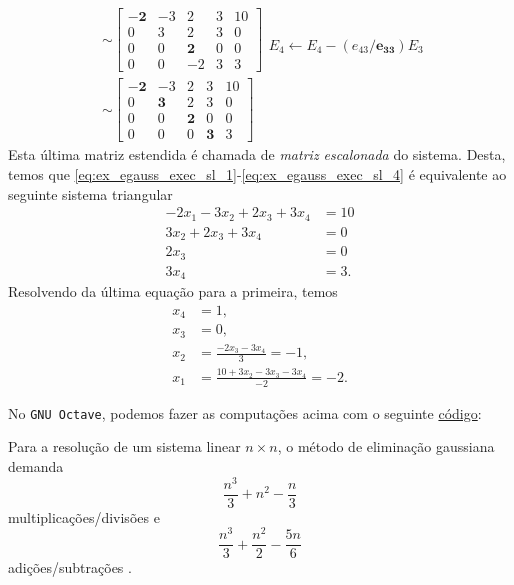 \begin{ex}
\begin{align}
&\sim 
  \begin{bmatrix}
    \pmb{-2} & -3 & 2 & 3 & 10\\
    0 & 3 & 2 & 3 & 0\\
    0 & 0 & \pmb{2} & 0 & 0\\
    0 & 0 & -2 & 3 & 3
  \end{bmatrix}
  \begin{matrix}
  \\
  \\
  \\
  E_4 \leftarrow E_4 - (e_{43}/\pmb{e_{33}})E_3\\
  \end{matrix}\\
    &\sim 
      \begin{bmatrix}
        \pmb{-2} & -3 & 2 & 3 & 10\\
        0 & \pmb{3} & 2 & 3 & 0\\
        0 & 0 & \pmb{2} & 0 & 0\\
        0 & 0 & 0 & \pmb{3} & 3
      \end{bmatrix}
\end{align}
Esta última matriz estendida é chamada de \emph{matriz escalonada} do sistema. Desta, temos que \eqref{eq:ex_egauss_exec_sl_1}-\eqref{eq:ex_egauss_exec_sl_4} é equivalente ao seguinte sistema triangular
\begin{align}
  -2x_1 - 3x_2 + 2x_3 + 3x_4 &= 10\\
  3x_2 + 2x_3 + 3x_4 &= 0\\
  2x_3 &= 0\\
  3x_4 &= 3.
\end{align}
Resolvendo da última equação para a primeira, temos
\begin{align}
  x_4 &= 1,\\
  x_3 &= 0,\\
  x_2 &= \frac{-2x_3 - 3x_4}{3} = -1,\\
  x_1 &= \frac{10 + 3x_2 - 3x_3 - 3x_4}{-2} = -2.
\end{align}

\ifisoctave
No \verb+GNU Octave+, podemos fazer as computações acima com o seguinte \href{https://github.com/phkonzen/notas/blob/master/src/MatematicaNumerica/cap_sl_direto/dados/ex_egauss_exec/ex_egauss_exec.m}{código}:

\fi
\end{ex}

\begin{obs}
  Para a resolução de um sistema linear $n \times n$, o método de eliminação gaussiana demanda
  \begin{equation}
    \frac{n^3}{3} + n^2 - \frac{n}{3}
  \end{equation}
multiplicações/divisões e
\begin{equation}
  \frac{n^3}{3} + \frac{n^2}{2} - \frac{5n}{6}
\end{equation}
adições/subtrações \cite{Burden2015a}.
\end{obs}

